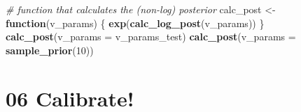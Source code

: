 \documentclass[
]{article}
\newenvironment{Shaded}{\begin{snugshade}}{\end{snugshade}}
\newcommand{\CommentTok}[1]{\textcolor[rgb]{0.56,0.35,0.01}{\textit{#1}}}
\newcommand{\ControlFlowTok}[1]{\textcolor[rgb]{0.13,0.29,0.53}{\textbf{#1}}}
\newcommand{\DataTypeTok}[1]{\textcolor[rgb]{0.13,0.29,0.53}{#1}}
\newcommand{\DecValTok}[1]{\textcolor[rgb]{0.00,0.00,0.81}{#1}}
\newcommand{\KeywordTok}[1]{\textcolor[rgb]{0.13,0.29,0.53}{\textbf{#1}}}
\newcommand{\NormalTok}[1]{#1}
\newcommand{\StringTok}[1]{\textcolor[rgb]{0.31,0.60,0.02}{#1}}
\begin{document}
\begin{Shaded}
\begin{Highlighting}[]
\CommentTok{# function that calculates the (non-log) posterior}
\NormalTok{calc_post <-}\StringTok{ }\ControlFlowTok{function}\NormalTok{(v_params) \{ }
  \KeywordTok{exp}\NormalTok{(}\KeywordTok{calc_log_post}\NormalTok{(v_params)) }
\NormalTok{\}}
\KeywordTok{calc_post}\NormalTok{(}\DataTypeTok{v_params =}\NormalTok{ v_params_test)}
\KeywordTok{calc_post}\NormalTok{(}\DataTypeTok{v_params =} \KeywordTok{sample_prior}\NormalTok{(}\DecValTok{10}\NormalTok{))}
\end{Highlighting}
\end{Shaded}

\hypertarget{calibrate}{%
\section{06 Calibrate!}\label{calibrate}}
\end{document}

